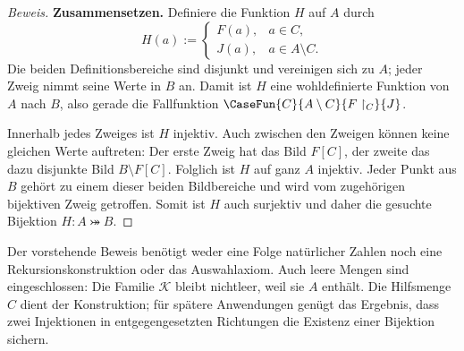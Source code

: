 \begin{proof}[Beweis]
\medskip\noindent
\textbf{Zusammensetzen.}
Definiere die Funktion \(H\) auf \(A\) durch
\[
  H(a):=
  \begin{cases}
    F(a),&a\in C,\\
    J(a),&a\in A\setminus C.
  \end{cases}
\]
Die beiden Definitionsbereiche sind disjunkt und vereinigen sich zu
\(A\); jeder Zweig nimmt seine Werte in \(B\) an. Damit ist \(H\)
eine wohldefinierte Funktion von \(A\) nach \(B\), also gerade die
Fallfunktion \(\CaseFun{C}{A\setminus C}{F\restriction_C}{J}\).

Innerhalb jedes Zweiges ist \(H\) injektiv. Auch zwischen den Zweigen
können keine gleichen Werte auftreten: Der erste Zweig hat das Bild
\(F[C]\), der zweite das dazu disjunkte Bild \(B\setminus F[C]\).
Folglich ist \(H\) auf ganz \(A\) injektiv. Jeder Punkt aus \(B\)
gehört zu einem dieser beiden Bildbereiche und wird vom zugehörigen
bijektiven Zweig getroffen. Somit ist \(H\) auch surjektiv und daher
die gesuchte Bijektion \(H\colon A\bij B\).
\end{proof}

Der vorstehende Beweis benötigt weder eine Folge natürlicher Zahlen noch eine
Rekursionskonstruktion oder das Auswahlaxiom. Auch leere Mengen sind
eingeschlossen: Die Familie \(\mathcal K\) bleibt nichtleer, weil
sie \(A\) enthält. Die Hilfsmenge \(C\) dient der Konstruktion;
für spätere Anwendungen genügt das Ergebnis, dass zwei Injektionen
in entgegengesetzten Richtungen die Existenz einer Bijektion sichern.
